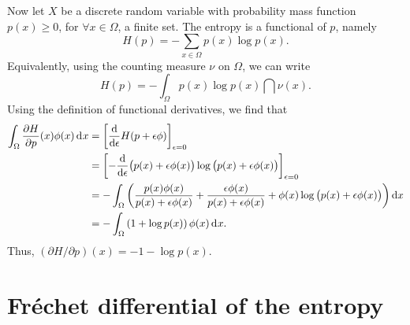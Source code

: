 Now let $X$ be a discrete random variable with probability mass function $p(x) \geq 0$, for $\forall x \in \Omega$, a finite set.
The entropy is a functional of $p$, namely
\[
  H(p) = - \sum_{x\in\Omega} p(x)\log p(x).
\]
Equivalently, using the counting measure $\nu$ on $\Omega$, we can write
\[
  H(p) = -\int_\Omega p(x) \log p(x) \dint\nu(x).
\]
Using the definition of functional derivatives, we find that
\begin{align*}
  \int_\Omega \frac{\partial H}{\partial p}(x)\phi(x) \operatorname{d}\hspace{0.5pt}\! x
  &= \left[ \frac{\text{d}}{\text{d} \epsilon} H(p +  \epsilon\phi) \right]_{\epsilon=0} \\
  &= \left[ -\frac{\text{d}}{\text{d} \epsilon} 
  \big( p(x) + \epsilon\phi(x) \big) 
  \log \big(p(x) + \epsilon\phi(x) \big) 
  \right]_{\epsilon=0} \\
  &= -\int_\Omega \left( 
  \frac{p(x)\phi(x)}{p(x)+\epsilon\phi(x)}
  + \frac{\epsilon\phi(x)}{p(x) + \epsilon\phi(x)}
  + \phi(x)\log\big( p(x) + \epsilon\phi(x) \big)
  \right) \text{d} x \\
  &= -\int_\Omega \left( 1 + \log p(x) \right) \phi(x) \operatorname{d}\hspace{0.5pt}\! x.
\end{align*}
Thus, $(\partial H/\partial p)(x) = -1 -\log p(x)$.

\section{Fréchet differential of the entropy}

